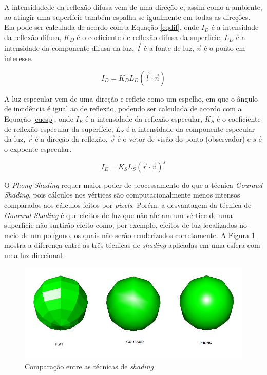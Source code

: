 {	A intensidadede da reflexão difusa vem de uma direção e, assim como a ambiente, ao atingir uma superfície também espalha-se igualmente em todas as direções. Ela pode ser calculada de acordo com a Equação \ref{eqdif}, onde $I_D$ é a intensidade da reflexão difusa, $K_ {D}$ é o coeficiente de reflexão difusa da superfície, $L_ {D}$ é a intensidade da componente difusa da luz, $\vec{ l}$ é a fonte de luz, $\vec{ n}$ é o ponto em interesse.

	\begin{equation}
		I_ {D} = K_ {D}L_ {D}( \vec{ l} \cdot \vec{ n}) 
	\label{eqdif}
	\end{equation}

	 A luz especular vem de uma direção e reflete como um espelho, em que o ângulo de incidência é igual ao de reflexão, podendo ser calculada de acordo com a Equação \ref{eqesp}, onde $I_E$ é a intensidade da reflexão especular, $K_ {S}$ é o coeficiente de reflexão especular da superfície, $L_ {S}$ é a intensidade da componente especular da luz, $\vec{ r}$ é a direção da reflexão, $\vec{v}$ é o vetor de visão do ponto (observador) e $s$ é o expoente especular.

	\begin{equation}
		I_ {E} =K_ {S}L_ {S} (\vec{ r} \cdot \vec{ v})^s
	\label{eqesp}
	\end{equation}

	 O \textit{Phong Shading} requer maior poder de processamento do que a técnica \textit{Gouraud Shading}, pois cálculos nos vértices são computacionalmente menos intensos comparados aos cálculos feitos por \textit{pixels}. Porém, a desvantagem da técnica de \textit{Gouraud Shading} é que efeitos de luz que não afetam um vértice de uma superfície não surtirão efeito como, por exemplo, efeitos de luz localizados no meio de um polígono, os quais não serão renderizados corretamente. A Figura \ref{fgp} mostra a diferença entre as três técnicas de \textit{shading} aplicadas em uma esfera com uma luz direcional. 

	\begin{figure}[ht]
	\centering
		\includegraphics[keepaspectratio=true,scale=0.5]{figuras/flatgp.jpg}
	\caption{Comparação entre as técnicas de \textit{shading}}
	\label{fgp}
	\end{figure}

}
